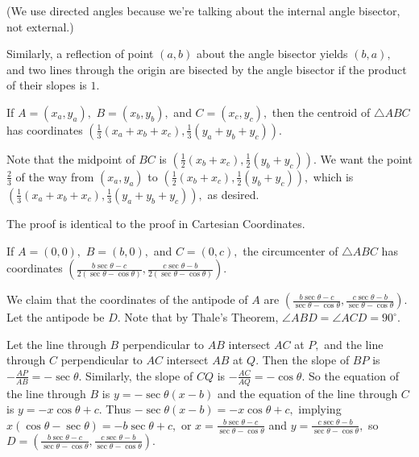 \documentclass[mast]{lucky}
\begin{document}
(We use directed angles because we're talking about the internal angle bisector, not external.)

Similarly, a reflection of point $(a,b)$ about the angle bisector yields $(b,a),$ and two lines through the origin are bisected by the angle bisector if the product of their slopes is $1.$

\begin{theo}[Centroid]
If $A=(x_a,y_a),$ $B=(x_b,y_b),$ and $C=(x_c,y_c),$ then the centroid of $\triangle ABC$ has coordinates $(\frac{1}{3}(x_a+x_b+x_c),\frac{1}{3}(y_a+y_b+y_c)).$
\end{theo}

\begin{pro}
Note that the midpoint of $BC$ is $(\frac{1}{2}(x_b+x_c),\frac{1}{2}(y_b+y_c)).$ We want the point $\frac{2}{3}$ of the way from $(x_a,y_a)$ to $(\frac{1}{2}(x_b+x_c),\frac{1}{2}(y_b+y_c)),$ which is $(\frac{1}{3}(x_a+x_b+x_c),\frac{1}{3}(y_a+y_b+y_c)),$ as desired.
\end{pro}

The proof is identical to the proof in Cartesian Coordinates.

\begin{theo}[Circumcenter]
If $A=(0,0),$ $B=(b,0),$ and $C=(0,c),$ the circumcenter of $\triangle ABC$ has coordinates $(\frac{b\sec\theta-c}{2(\sec\theta-\cos\theta)},\frac{c\sec\theta-b}{2(\sec\theta-\cos\theta)}).$
\end{theo}

\begin{pro}
We claim that the coordinates of the antipode of $A$ are $(\frac{b\sec\theta-c}{\sec\theta-\cos\theta},\frac{c\sec\theta-b}{\sec\theta-\cos\theta}).$ Let the antipode be $D.$ Note that by Thale's Theorem, $\angle ABD=\angle ACD=90^{\circ}.$

Let the line through $B$ perpendicular to $AB$ intersect $AC$ at $P,$ and the line through $C$ perpendicular to $AC$ intersect $AB$ at $Q.$ Then the slope of $BP$ is $-\frac{AP}{AB}=-\sec\theta.$ Similarly, the slope of $CQ$ is $-\frac{AC}{AQ}=-\cos\theta.$ So the equation of the line through $B$ is $y=-\sec\theta(x-b)$ and the equation of the line through $C$ is $y=-x\cos\theta+c.$ Thus $-\sec\theta(x-b)=-x\cos\theta+c,$ implying $x(\cos\theta-\sec\theta)=-b\sec\theta+c,$ or $x=\frac{b\sec\theta-c}{\sec\theta-\cos\theta}$ and $y=\frac{c\sec\theta-b}{\sec\theta-\cos\theta},$ so $D=(\frac{b\sec\theta-c}{\sec\theta-\cos\theta},\frac{c\sec\theta-b}{\sec\theta-\cos\theta}).$
\end{pro}
\end{document}
